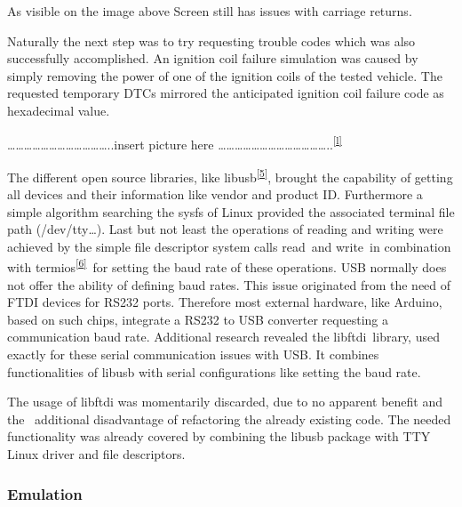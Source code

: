 {As visible on the image above Screen still has issues with carriage
returns.}

{Naturally the next step was to try requesting trouble codes which was
also successfully accomplished. An ignition coil failure simulation was
caused by simply removing the power of one of the ignition coils of the
tested vehicle. The requested temporary DTCs mirrored the anticipated
ignition coil failure code as hexadecimal value. ~}

{}

{\ldots{}\ldots{}\ldots{}\ldots{}\ldots{}\ldots{}\ldots{}\ldots{}\ldots{}\ldots{}\ldots{}\ldots{}..insert
picture here
\ldots{}\ldots{}\ldots{}\ldots{}\ldots{}\ldots{}\ldots{}\ldots{}\ldots{}\ldots{}\ldots{}\ldots{}\ldots{}..}\textsuperscript{\protect\hyperlink{cmnt12}{{[}l{]}}}

{}

{The different }{open source libraries, like
libusb}\textsuperscript{\protect\hyperlink{ftnt5}{{[}5{]}}}{, brought
the capability of getting all devices and their information like vendor
and product ID. Furthermore a simple algorithm searching the sysfs of
Linux provided the associated terminal file path (/dev/tty\ldots{}).
Last but not least the operations of reading and writing were achieved
by the simple file descriptor system calls }{read}{~and }{write}{~in
combination with
}{termios}\textsuperscript{\protect\hyperlink{ftnt6}{{[}6{]}}}{~for
setting the baud rate of these operations. USB normally does not offer
the ability of defining baud rates. This issue originated from the need
of FTDI devices for RS232 ports. Therefore most external hardware, like
Arduino, based on such chips, integrate a RS232 to USB converter
requesting a communication baud rate. Additional research revealed the
}{libftdi}{~library, used exactly for these serial communication issues
with USB. It combines functionalities of libusb with serial
configurations like setting the baud rate. }

{The usage of }{libftdi }{was momentarily discarded, due to no apparent
benefit and the ~additional disadvantage of refactoring the already
existing code. The needed functionality was already covered by combining
the }{libusb }{package with TTY Linux driver and file descriptors.}

\hypertarget{h.nfl0zlavkqps}{\subsubsection{\texorpdfstring{{Emulation}}{Emulation}}\label{h.nfl0zlavkqps}}

